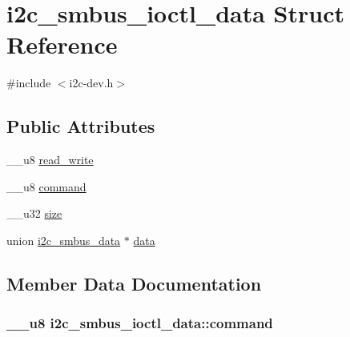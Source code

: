 \hypertarget{structi2c__smbus__ioctl__data}{}\section{i2c\+\_\+smbus\+\_\+ioctl\+\_\+data Struct Reference}
\label{structi2c__smbus__ioctl__data}


{\ttfamily \#include $<$i2c-\/dev.\+h$>$}

\subsection*{Public Attributes}
\begin{DoxyCompactItemize}
\item 
\+\_\+\+\_\+u8 \hyperlink{structi2c__smbus__ioctl__data_a545643b68fb6ee6806aadc62f5c9a9b0}{read\+\_\+write}
\item 
\+\_\+\+\_\+u8 \hyperlink{structi2c__smbus__ioctl__data_a5c97619b99fbc3231d877acfe428826b}{command}
\item 
\+\_\+\+\_\+u32 \hyperlink{structi2c__smbus__ioctl__data_a8656ac3dfa404899f6549baea41cf342}{size}
\item 
union \hyperlink{unioni2c__smbus__data}{i2c\+\_\+smbus\+\_\+data} $\ast$ \hyperlink{structi2c__smbus__ioctl__data_a05e3efd596ce6ee38476d27cef6d6e73}{data}
\end{DoxyCompactItemize}


\subsection{Member Data Documentation}
\hypertarget{structi2c__smbus__ioctl__data_a5c97619b99fbc3231d877acfe428826b}{}
\subsubsection[{command}]{\setlength{\rightskip}{0pt plus 5cm}\+\_\+\+\_\+u8 i2c\+\_\+smbus\+\_\+ioctl\+\_\+data\+::command}\label{structi2c__smbus__ioctl__data_a5c97619b99fbc3231d877acfe428826b}
\hypertarget{structi2c__smbus__ioctl__data_a05e3efd596ce6ee38476d27cef6d6e73}{}

